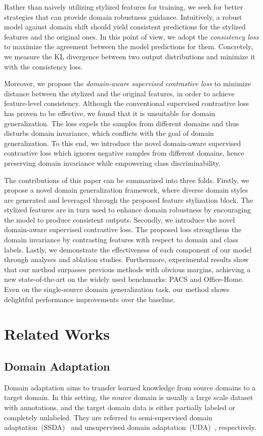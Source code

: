 \documentclass[sigconf]{acmart}
\begin{document}
Rather than naively utilizing stylized features for training, we seek for better strategies that can provide domain robustness guidance.
Intuitively, a robust model against domain shift should yield consistent predictions for the stylized features and the original ones. In this point of view, we adopt the \textit{consistency loss} to maximize the agreement between the model predictions for them.
Concretely, we measure the KL divergence between two output distributions and minimize it with the consistency loss.

Moreover, we propose the \textit{domain-aware supervised contrastive loss} to minimize distance between the stylized and the original features, in order to achieve feature-level consistency. Although the conventional supervised contrastive loss has proven to be effective, we found that it is unsuitable for domain generalization.
The loss expels the samples from different domains and thus disturbs domain invariance, which conflicts with the goal of domain generalization.
To this end, we introduce the novel domain-aware supervised contrastive loss which ignores negative samples from different domains, hence preserving domain invariance while empowering class discriminability.

The contributions of this paper can be summarized into three folds. Firstly, we propose a novel domain generalization framework, where diverse domain styles are generated and leveraged through the proposed feature stylization block.
The stylized features are in turn used to enhance domain robustness by encouraging the model to produce consistent outputs.
Secondly, we introduce the novel domain-aware supervised contrastive loss. The proposed loss strengthens the domain invariance by contrasting features with respect to domain and class labels. Lastly, we demonstrate the effectiveness of each component of our model through analyses and ablation studies. Furthermore, experimental results show that our method surpasses previous methods with obvious margins, achieving a new state-of-the-art on the widely used benchmarks: PACS and Office-Home. Even on the single-source domain generalization task, our method shows delightful performance improvements over the baseline.

\section{Related Works}

\subsection{Domain Adaptation}
Domain adaptation aims to transfer learned knowledge from source domains to a target domain. In this setting, the source domain is usually a large scale dataset with annotations, and the target domain data is either partially labeled or completely unlabeled. They are referred to semi-supervised domain adaptation~(SSDA)~\cite{donahue2013semi, yao2015semi, ao2017fast, saito2019semi} and unsupervised domain adaptation~(UDA)~\cite{daume2009frustratingly, sun2016return, tzeng2017adversarial, hoffman2018cycada, saito2018maximum, yue2019domain, kim2020learning}, respectively. 
\end{document}
